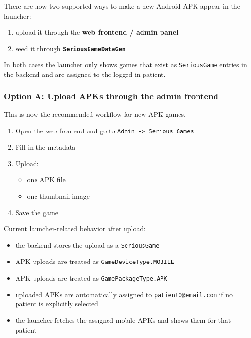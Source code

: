 There are now two supported ways to make a new Android APK appear in the
launcher:

\begin{enumerate}
\def\labelenumi{\arabic{enumi}.}
\tightlist
\item
  upload it through the \textbf{web frontend / admin panel}
\item
  seed it through \textbf{\texttt{SeriousGameDataGen}}
\end{enumerate}

In both cases the launcher only shows games that exist as
\texttt{SeriousGame} entries in the backend and are assigned to the
logged-in patient.

\subsubsection{Option A: Upload APKs through the admin
frontend}\label{option-a-upload-apks-through-the-admin-frontend}

This is now the recommended workflow for new APK games.

\begin{enumerate}
\def\labelenumi{\arabic{enumi}.}
\tightlist
\item
  Open the web frontend and go to
  \texttt{Admin\ -\textgreater{}\ Serious\ Games}
\item
  Fill in the metadata
\item
  Upload:

  \begin{itemize}
  \tightlist
  \item
    one APK file
  \item
    one thumbnail image
  \end{itemize}
\item
  Save the game
\end{enumerate}

Current launcher-related behavior after upload:

\begin{itemize}
\tightlist
\item
  the backend stores the upload as a \texttt{SeriousGame}
\item
  APK uploads are treated as \texttt{GameDeviceType.MOBILE}
\item
  APK uploads are treated as \texttt{GamePackageType.APK}
\item
  uploaded APKs are automatically assigned to
  \texttt{patient0@email.com} if no patient is explicitly selected
\item
  the launcher fetches the assigned mobile APKs and shows them for that
  patient
\end{itemize}

